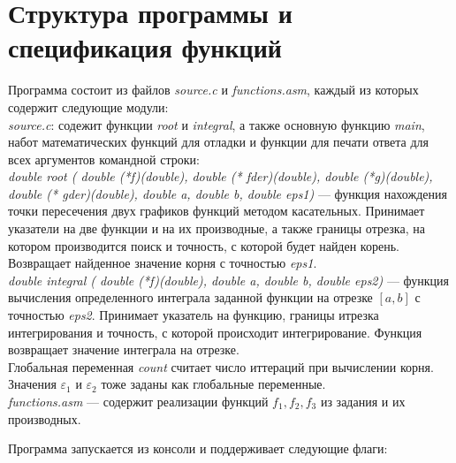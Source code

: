 \documentclass[a4paper,12pt,titlepage,finall]{article}
\begin{document}
\newpage

\section{Структура программы и спецификация функций}

Программа состоит из файлов \textsl{source.c} и \textsl{functions.asm}, каждый из которых содержит следующие модули:\\

\textsl{source.c}: содежит функции \textsl{root} и \textsl{integral}, а также основную функцию \textsl{main}, набот математических функций для отладки и функции для печати ответа для всех аргументов командной строки:\\



\textsl{double root ( double (*f)(double), double (* fder)(double), double (*g)(double), double (* gder)(double), double a, double b, double eps1)} --- функция нахождения точки пересечения двух графиков функций методом касательных. Принимает указатели на две функции и на их производные, а также границы отрезка, на котором производится поиск и точность, с которой будет найден корень. Возвращает найденное значение корня с точностью \textsl{eps1}.\\

\textsl{double integral ( double (*f)(double), double a, double b, double eps2)} --- функция вычисления определенного интеграла заданной функции на отрезке $[a, b]$ с точностью \textsl{eps2}. Принимает указатель на функцию, границы итрезка интегрирования и точность, с которой происходит интегрирование. Функция возвращает значение интеграла на отрезке.\\

Глобальная переменная \textsl{count} считает число иттераций при вычислении корня. Значения $\varepsilon_1$ и $\varepsilon_2$ тоже заданы как глобальные переменные.\\

\textsl{functions.asm} --- содержит реализации функций $f_1, f_2, f_3$ из задания и их производных.

Программа запускается из консоли и поддерживает следующие флаги:
\end{document}
